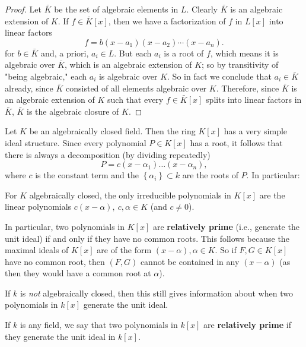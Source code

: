 \begin{proof}
Let $ \bar{K}$ be the set of algebraic elements in $ L$. Clearly $ \bar{K}$ is an algebraic extension of $ K$. If $ f \in \bar{K}[x]$, then we have a factorization of $ f$ in $ L[x]$ into linear factors
\[ f = b(x - a_1)(x - a_2) \dotsb (x - a_n). \]
for $ b \in \bar{K}$ and, a priori, $ a_i \in L$. But each $ a_i$ is a root of $ f$, which means it is algebraic over $ \bar{K}$, which is an algebraic extension of $ K$; so by transitivity of "being algebraic," each $ a_i$ is algebraic over $ K$. So in fact we conclude that $ a_i \in \bar{K}$ already, since $ \bar{K}$ consisted of all elements algebraic over $ K$. Therefore, since $ \bar{K}$ is an algebraic extension of $ K$ such that every $ f \in \bar{K}[x]$ splits into linear factors in $ \bar{K}$, $ \bar{K}$ is the algebraic closure of $ K$.

\end{proof}


Let $K$ be an algebraically closed field. Then the ring $K[x]$ has a very
simple ideal structure.
Since every polynomial $P \in K[x]$ has a root, it follows that there is always
a decomposition (by dividing repeatedly)
\[ P =c (x-\alpha_1)\dots(x-\alpha_n)  ,\]
where $c$ is the constant term and the $\left\{\alpha_i\right\} \subset k$ are the roots
of $P$.
In particular:
\begin{proposition} 
For $K$ algebraically closed, the only irreducible polynomials in $K[x]$ are
the linear polynomials $c(x-\alpha), \ c, \alpha \in K$ (and $c \neq 0$).
\end{proposition} 

In particular, two polynomials in $K[x]$ are \textbf{relatively prime}
(i.e., generate the unit ideal) if and only if they have no common roots. This
follows because the maximal ideals of $K[x]$ are of the form $(x-\alpha),
\alpha \in K$.
So if $F, G \in K[x]$ have no common root, then $(F, G)$ cannot be contained
in any $(x-\alpha)$ (as then they would have a common root at $\alpha$).


If $k$ is \emph{not} algebraically closed, then this still gives
information about when two polynomials in $k[x]$ generate the unit ideal.

\begin{definition} 
If $k$ is any field, we say that two polynomials in $k[x]$ are
\textbf{relatively prime} if they generate the unit ideal in $k[x]$.
\end{definition} 

